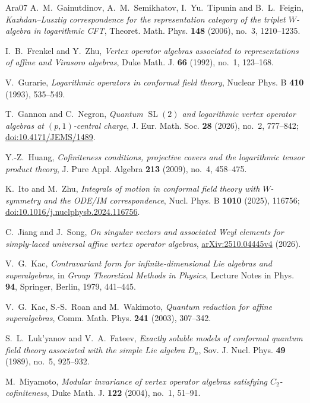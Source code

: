 \documentclass[11pt]{amsart}
\numberwithin{equation}{section}
\theoremstyle{definition}
\theoremstyle{remark}
\begin{document}
\begin{thebibliography}{Ara07}
A.~M.~Gainutdinov, A.~M.~Semikhatov, I.~Yu.~Tipunin and B.~L.~Feigin,
\emph{Kazhdan--Lusztig correspondence for the representation category
of the triplet $W$-algebra in logarithmic CFT},
Theoret. Math. Phys. \textbf{148} (2006), no.~3, 1210--1235.


I.~B.~Frenkel and Y.~Zhu,
\emph{Vertex operator algebras associated to representations of
affine and Virasoro algebras},
Duke Math. J. \textbf{66} (1992), no.~1, 123--168.




V.~Gurarie,
\emph{Logarithmic operators in conformal field theory},
Nuclear Phys. B \textbf{410} (1993), 535--549.

T.~Gannon and C.~Negron,
\emph{Quantum $\operatorname{SL}(2)$ and logarithmic vertex
operator algebras at $(p,1)$-central charge},
J. Eur. Math. Soc. \textbf{28} (2026), no.~2, 777--842;
\href{https://doi.org/10.4171/JEMS/1489}{doi:10.4171/JEMS/1489}.

Y.-Z.~Huang,
\emph{Cofiniteness conditions, projective covers and the
logarithmic tensor product theory},
J. Pure Appl. Algebra \textbf{213} (2009), no.~4, 458--475.


K.~Ito and M.~Zhu,
\emph{Integrals of motion in conformal field theory with $W$-symmetry
and the ODE/IM correspondence},
Nucl. Phys. B \textbf{1010} (2025), 116756;
\href{https://doi.org/10.1016/j.nuclphysb.2024.116756}{doi:10.1016/j.nuclphysb.2024.116756}.

C.~Jiang and J.~Song,
\emph{On singular vectors and associated Weyl elements for
simply-laced universal affine vertex operator algebras},
\href{https://arxiv.org/abs/2510.04445v4}{arXiv:2510.04445v4}
(2026).


V.~G.~Kac,
\emph{Contravariant form for infinite-dimensional Lie algebras and superalgebras},
in \emph{Group Theoretical Methods in Physics}, Lecture Notes in Phys.
\textbf{94}, Springer, Berlin, 1979, 441--445.

V.~G.~Kac, S.-S.~Roan and M.~Wakimoto,
\emph{Quantum reduction for affine superalgebras},
Comm. Math. Phys. \textbf{241} (2003), 307--342.

S.~L.~Luk'yanov and V.~A.~Fateev,
\emph{Exactly soluble models of conformal quantum field theory
associated with the simple Lie algebra $D_n$},
Sov. J. Nucl. Phys. \textbf{49} (1989), no.~5, 925--932.

M.~Miyamoto,
\emph{Modular invariance of vertex operator algebras satisfying
$C_2$-cofiniteness},
Duke Math. J. \textbf{122} (2004), no.~1, 51--91.


\end{thebibliography}
\end{document}
